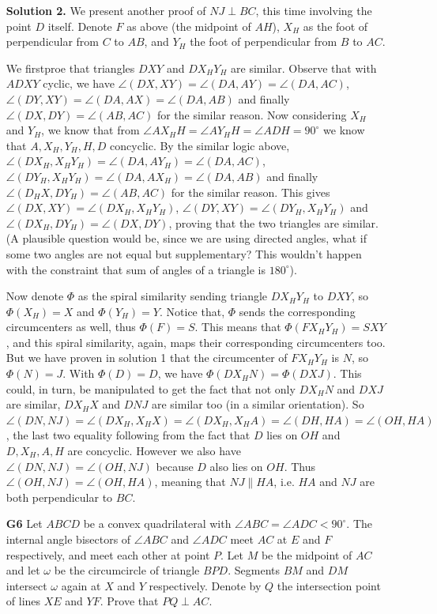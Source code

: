 \documentclass[11pt,a4paper]{article}
\begin{document}
\begin{itemize}
\textbf{Solution 2.} We present another proof of $NJ\perp BC$, this time involving the point $D$ itself. 
Denote $F$ as above (the midpoint of $AH$), $X_H$ as the foot of perpendicular from $C$ to $AB$, and $Y_H$ the foot of perpendicular from $B$ to $AC$. 

We firstproe that triangles $DXY$ and $DX_HY_H$ are similar. Observe that with $ADXY$ cyclic, we have $\angle (DX, XY)=\angle (DA, AY)=\angle (DA, AC)$, $\angle (DY, XY)=\angle (DA, AX)=\angle (DA, AB)$ and finally $\angle (DX, DY)=\angle (AB, AC)$ for the similar reason. 
Now considering $X_H$ and $Y_H$, we know that from $\angle AX_HH=\angle AY_HH=\angle ADH=90^{\circ}$ we know that $A, X_H, Y_H, H, D$ concyclic. By the similar logic above, 
$\angle (DX_H, X_HY_H)=\angle (DA, AY_H)=\angle (DA, AC)$, $\angle (DY_H, X_HY_H)=\angle (DA, AX_H)=\angle (DA, AB)$ and finally $\angle (D_HX, DY_H)=\angle (AB, AC)$ for the similar reason. 
This gives $\angle (DX, XY)=\angle (DX_H, X_HY_H)$, $\angle (DY, XY)=\angle (DY_H, X_HY_H)$ and $\angle (DX_H, DY_H)=\angle (DX, DY)$, proving that the two triangles are similar. 
(A plausible question would be, since we are using directed angles, what if some two angles are not equal but supplementary? 
This wouldn't happen with the constraint that sum of angles of a triangle is $180^{\circ}$). 

Now denote $\Phi$ as the spiral similarity sending triangle $DX_HY_H$ to $DXY$, so $\Phi(X_H)=X$ and $\Phi(Y_H)=Y$. Notice that, $\Phi$ sends the corresponding circumcenters as well, thus $\Phi(F)=S$. 
This means that $\Phi(FX_HY_H)=SXY$, and this spiral similarity, again, maps their corresponding circumcenters too. 
But we have proven in solution 1 that the circumcenter of $FX_HY_H$ is $N$, so $\Phi(N)=J$. 
With $\Phi(D)=D$, we have $\Phi(DX_HN)=\Phi(DXJ)$. This could, in turn, be manipulated to get the fact that not only $DX_HN$ and $DXJ$ are similar, $DX_HX$ and $DNJ$ are similar too (in a similar orientation). So $\angle (DN, NJ)=\angle (DX_H, X_HX)=\angle (DX_H, X_HA)=\angle (DH, HA)=\angle (OH, HA)$, the last two equality following from the fact that $D$ lies on $OH$ and $D, X_H, A, H$ are concyclic. However we also have $\angle (DN, NJ)=\angle (OH, NJ)$ because $D$ also lies on $OH$. Thus $\angle (OH, NJ)=\angle (OH, HA)$, meaning that $NJ\parallel HA$, i.e. $HA$ and $NJ$ are both perpendicular to $BC$. 


\newpage 

\item[\textbf{G6}]
Let $ABCD$ be a convex quadrilateral with $\angle ABC = \angle ADC < 90^{\circ}$. The internal angle bisectors of $\angle ABC$ and $\angle ADC$ meet $AC$ at $E$ and $F$ respectively, and meet each other at point $P$. Let $M$ be the midpoint of $AC$ and let $\omega$ be the circumcircle of triangle $BPD$. Segments $BM$ and $DM$ intersect $\omega$ again at $X$ and $Y$ respectively. Denote by $Q$ the intersection point of lines $XE$ and $YF$. Prove that $PQ \perp AC$.


\end{itemize}
\end{document}
